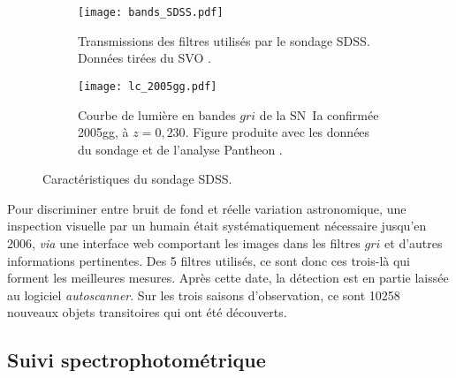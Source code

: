 \documentclass[../main/main.tex]{subfiles}
\begin{document}
\begin{figure}[ht]
    \centering
    \begin{subfigure}[]{.49\linewidth}
        \centering
        \texttt{[image: bands\_SDSS.pdf]}
        \caption{Transmissions des filtres utilisés par le sondage SDSS. Données
        tirées du SVO \citep{rodrigo2020}.}
        \label{fig:sdssbands}
    \end{subfigure}
    \begin{subfigure}[]{.49\linewidth}
        \centering
        \texttt{[image: lc\_2005gg.pdf]}
        \caption{Courbe de lumière en bandes $gri$ de la SN~Ia
            confirmée 2005gg, à $z = 0,230$. Figure produite avec les données du
        sondage et de l'analyse Pantheon \citep{scolnic2018}.}
        \label{fig:sdsslc}
    \end{subfigure}
    \caption{Caractéristiques du sondage SDSS.}
\end{figure}

% 

Pour discriminer entre bruit de fond et réelle variation astronomique, une
inspection visuelle par un humain était systématiquement nécessaire jusqu'en
2006, \textit{via} une interface web comportant les images dans les filtres
$gri$ et d'autres informations pertinentes. Des 5 filtres utilisés, ce sont donc
ces trois-là qui forment les meilleures mesures. Après cette date, la détection
est en partie laissée au logiciel \textit{autoscanner}. Sur les trois saisons
d'observation, ce sont 10258 nouveaux objets transitoires qui ont été
découverts.

\subsection{Suivi spectrophotométrique}\label{ssec:sdssspectro}
\end{document}
